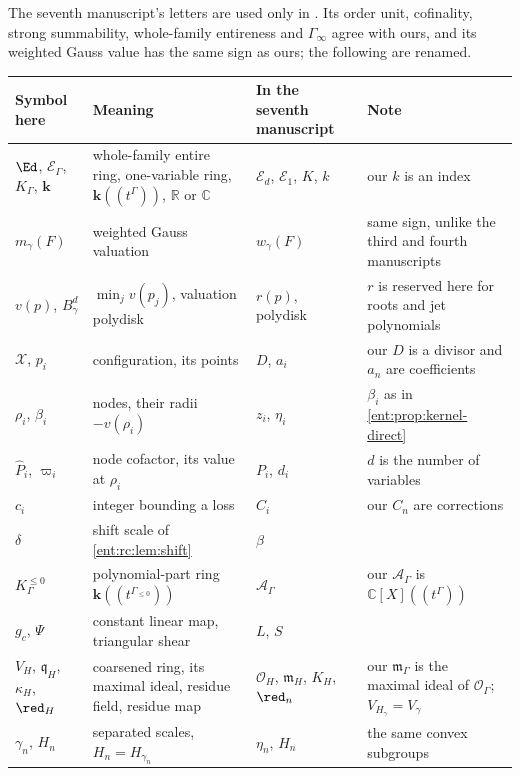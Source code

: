 \documentclass[11pt]{article}
\theoremstyle{plain}
\theoremstyle{plain}
\theoremstyle{plain}
\theoremstyle{definition}
\theoremstyle{definition}
\theoremstyle{definition}
\theoremstyle{definition}
\theoremstyle{remark}
\newcommand{\C}{\mathbb C}\newcommand{\R}{\mathbb R}
\newcommand{\K}{K_\Gamma}\newcommand{\KD}{K_\Delta}
\newcommand{\E}{\mathcal E_\Gamma}
\newcommand{\A}{\mathcal A_\Gamma}\newcommand{\OO}{\mathcal O_\Gamma}
\newcommand{\mm}{\mathfrak m_\Gamma}
\newcommand{\kk}{\mathbf k}\newcommand{\PP}{\mathbb P}
\newcommand{\Kle}{K_\Gamma^{\le0}}\DeclareMathOperator{\Jac}{Jac}
\begin{document}
The seventh manuscript's letters are used only in
. Its order unit,
cofinality, strong summability, whole-family entireness and $\Gamma_\infty$
agree with ours, and its weighted Gauss value has the same sign as ours; the
following are renamed.

\begin{center}\small
\begin{tabularx}{\textwidth}{@{}P{0.2\textwidth}P{0.3\textwidth}P{0.17\textwidth}Y@{}}
\toprule
Symbol here & Meaning & In the seventh manuscript & Note\\\midrule
$\Ed$, $\E$, $\K$, $\kk$ & whole-family entire ring, one-variable ring,
$\kk((t^\Gamma))$, $\R$ or $\C$ & $\mathcal E_d$, $\mathcal E_1$, $K$, $k$ &
our $k$ is an index\\[0.3em]
$m_\gamma(F)$ & weighted Gauss valuation & $w_\gamma(F)$ & same sign, unlike
the third and fourth manuscripts\\[0.3em]
$v(p)$, $B^d_\gamma$ & $\min_jv(p_j)$, valuation polydisk & $r(p)$, polydisk
& $r$ is reserved here for roots and jet polynomials\\[0.3em]
$\mathcal X$, $p_i$ & configuration, its points & $D$, $a_i$ & our $D$ is a
divisor and $a_n$ are coefficients\\[0.3em]
$\rho_i$, $\beta_i$ & nodes, their radii $-v(\rho_i)$ & $z_i$, $\eta_i$ &
$\beta_i$ as in \cref{ent:prop:kernel-direct}\\[0.3em]
$\widehat P_i$, $\varpi_i$ & node cofactor, its value at $\rho_i$ & $P_i$,
$d_i$ & $d$ is the number of variables\\[0.3em]
$c_i$ & integer bounding a loss & $C_i$ & our $C_n$ are corrections\\[0.3em]
$\delta$ & shift scale of \cref{ent:rc:lem:shift} & $\beta$ & \\[0.3em]
$\Kle$ & polynomial-part ring $\kk((t^{\Gamma_{\le0}}))$ & $\mathcal A_\Gamma$
& our $\A$ is $\C[X]((t^\Gamma))$\\[0.3em]
$g_c$, $\Psi$ & constant linear map, triangular shear & $L$, $S$ & \\[0.3em]
$V_H$, $\mathfrak q_H$, $\kappa_H$, $\red_H$ & coarsened ring, its maximal
ideal, residue field, residue map & $\mathcal O_H$, $\mathfrak m_H$, $K_H$,
$\red_n$ & our $\mm$ is the maximal ideal of $\OO$; $V_{H_\gamma}=V_\gamma$\\[0.3em]
$\gamma_n$, $H_n$ & separated scales, $H_n=H_{\gamma_n}$ & $\eta_n$, $H_n$ &
the same convex subgroups\\[0.3em]

\end{tabularx}
\end{center}
\end{document}

